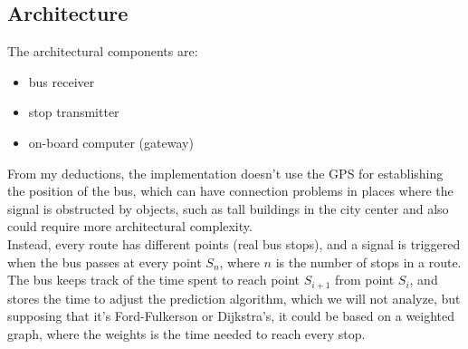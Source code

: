 \documentclass[a4paper, 12pt]{article}
\begin{document}
\subsection{Architecture} %
\label{sub:architecture}
The architectural components are:
\begin{itemize}
    \item bus receiver 
	\item stop transmitter
	\item on-board computer (gateway)
\end{itemize}
From my deductions, the implementation doesn't use the GPS for establishing the
position of the bus, which can
have connection problems in places where the signal is obstructed by
objects, such as tall buildings in the city center and also could require more
architectural complexity.\\
Instead, every route has different points (real bus stops), and a signal is
triggered when the bus passes at every point $S_{n}$, where $n$ is the number of
stops in a route. The bus keeps track of the time spent to reach point
$S_{i+1}$ from point $S_{i}$, and stores the time to adjust the prediction
algorithm, which we will not analyze, but supposing that it's Ford-Fulkerson or
Dijkstra's, it could be based on a weighted graph, where the weights is the time
needed to reach every stop.

\end{document}
